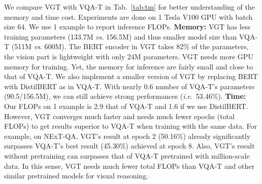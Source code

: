 \documentclass[runningheads]{llncs}
\newcommand{\ie}{\textit{i}.\textit{e}.}
\newcommand{\vs}{\textit{vs}. }
\begin{document}
We compare VGT with VQA-T \cite{yang2021just} in Tab.~\ref{tab:tm} for better understanding of the memory and time cost. Experiments are done on 1 Tesla V100 GPU with batch size 64. We use 1 example to report inference FLOPs.
\textbf{{Memory:}} VGT has less training parameters (133.7M \vs 156.5M) and thus smaller model size than VQA-T (511M \vs 600M). The BERT encoder in VGT takes 82\% of the parameters, the vision part is lightweight with only 24M parameters. VGT needs more GPU memory for training. Yet, the memory for inference are fairly small and close to that of VQA-T. We also implement a smaller version of VGT by replacing BERT with DistilBERT \cite{sanh2019distilbert} as in VQA-T. With nearly 0.6 number of VQA-T's parameters (90.5/156.5M), we can still achieve strong performances (\ie~53.46\%).
\textbf{{Time:}} Our FLOPs on 1 example is 2.9 that of VQA-T and 1.6 if we use DistilBERT. However, VGT converges much faster and needs much fewer epochs (total FLOPs) to get results superior to VQA-T when training with the same data. For example, on NExT-QA, VGT's result at epoch 2 (50.16\%) already significantly surpasses VQA-T's best result (45.30\%) achieved at epoch 8. Also, VGT's result without pretraining can surpasses that of VQA-T pretrained with million-scale data. In this sense, VGT needs much fewer total FLOPs than VQA-T and other similar pretrained models for visual reasoning.  
\end{document}
